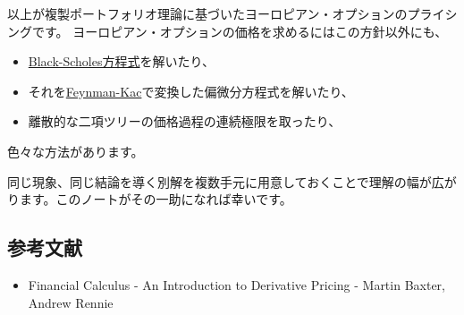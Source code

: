 \documentclass[uplatex,a4j,12pt,dvipdfmx]{jsarticle}
\begin{document}
以上が複製ポートフォリオ理論に基づいたヨーロピアン・オプションのプライシングです。
ヨーロピアン・オプションの価格を求めるにはこの方針以外にも、
\begin{itemize}
	\item \href{https://ja.wikipedia.org/wiki/%E3%83%96%E3%83%A9%E3%83%83%E3%82%AF%E2%80%93%E3%82%B7%E3%83%A7%E3%83%BC%E3%83%AB%E3%82%BA%E6%96%B9%E7%A8%8B%E5%BC%8F}{Black-Scholes方程式}を解いたり、
	\item それを\href{https://ja.wikipedia.org/wiki/%E3%83%95%E3%82%A1%E3%82%A4%E3%83%B3%E3%83%9E%E3%83%B3%E2%80%93%E3%82%AB%E3%83%83%E3%83%84%E3%81%AE%E5%85%AC%E5%BC%8F}{Feynman-Kac}で変換した偏微分方程式を解いたり、
	\item 離散的な二項ツリーの価格過程の連続極限を取ったり、
\end{itemize}
色々な方法があります。

同じ現象、同じ結論を導く別解を複数手元に用意しておくことで理解の幅が広がります。このノートがその一助になれば幸いです。

\subsection{参考文献}
\begin{itemize}
	\item Financial Calculus - An Introduction to Derivative Pricing - Martin Baxter, Andrew Rennie
\end{itemize}
\end{document}
